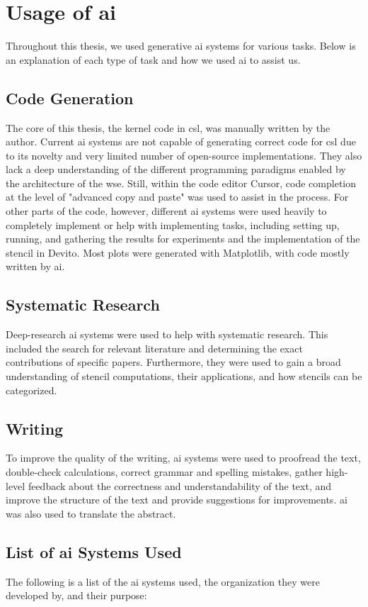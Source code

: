 \chapter{Usage of \ac{ai}}
Throughout this thesis, we used generative \ac{ai} systems for various tasks.
Below is an explanation of each type of task and how we used \ac{ai} to assist us.

\section{Code Generation}
The core of this thesis, the kernel code in \ac{csl}, was manually written by the author. Current \ac{ai} systems are not capable of generating correct code for \ac{csl} due to its novelty and very limited number of open-source implementations. They also lack a deep understanding of the different programming paradigms enabled by the architecture of the \ac{wse}. Still, within the code editor Cursor, code completion at the level of "advanced copy and paste" was used to assist in the process. For other parts of the code, however, different \ac{ai} systems were used heavily to completely implement or help with implementing tasks, including setting up, running, and gathering the results for experiments and the implementation of the stencil in Devito. Most plots were generated with Matplotlib, with code mostly written by \ac{ai}.

\section{Systematic Research}
Deep-research \ac{ai} systems were used to help with systematic research. This included the search for relevant literature and determining the exact contributions of specific papers. Furthermore, they were used to gain a broad understanding of stencil computations, their applications, and how stencils can be categorized.

\section{Writing}
To improve the quality of the writing, \ac{ai} systems were used to proofread the text, double-check calculations, correct grammar and spelling mistakes, gather high-level feedback about the correctness and understandability of the text, and improve the structure of the text and provide suggestions for improvements. \ac{ai} was also used to translate the abstract.

\section{List of \ac{ai} Systems Used}
The following is a list of the \ac{ai} systems used, the organization they were developed by, and their purpose:

